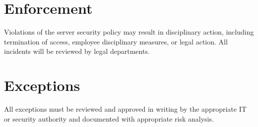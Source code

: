 \section{Enforcement}
Violations of the server security policy may result in disciplinary action, including termination of access, employee disciplinary measures, or legal action. All incidents will be reviewed by legal departments.

\section{Exceptions}
All exceptions must be reviewed and approved in writing by the appropriate IT or security authority and documented with appropriate risk analysis.

